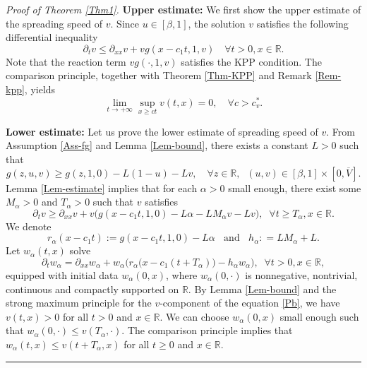 \documentclass[10pt]{article}
\numberwithin{equation}{section}
\newcommand{\R}{\mathbb{R}}
\newenvironment{proof}[1][Proof]{\noindent\textit{#1.} }{\hfill \rule{0.5em}{0.5em}}
\begin{document}
\begin{proof}[Proof of Theorem \ref{Thm1}]
\textbf{Upper estimate:}
 We  first  show the upper estimate of the spreading speed of $v$.  Since  $u\in [\beta, 1]$,  the solution $v$ satisfies the following differential inequality
\begin{equation*}
\partial_t  v \leq \partial_{xx} v + v g(x-c_1t, 1, v) \quad \forall t>0, x\in \R.
\end{equation*}
Note that  the reaction term   $vg(\cdot, 1, v)$ satisfies the  KPP condition.
The comparison principle, together with Theorem \ref{Thm-KPP} and Remark \ref{Rem-kpp},  yields 
 \begin{equation*}
\lim_{t\to +\infty} \sup_{ x\geq ct} v(t, x) =0,  \quad \forall c> c^*_v.
 \end{equation*}


\vspace{1em}
\noindent \textbf{Lower estimate: }
Let us  prove  the lower estimate of spreading speed of $v$.    From Assumption \ref{Ass-fg} and Lemma \ref{Lem-bound}, there exists a constant $L>0$ such that   
$$g(z,u,v)  \geq  g(z,1,0) - L(1-u) -Lv, \quad \forall z\in \R,  \;\; (u, v) \in [\beta, 1] \times [0, \overline{V}]. $$
 Lemma \ref{Lem-estimate} implies that  for each  $\alpha >0$ small  enough, there exist  some $M_{\alpha}>0$ and $T_{\alpha}>0$ such that $v$ satisfies 
\begin{equation*}
\partial_{t} v \geq \partial_{xx} v+ v \bigg( g(x-c_1t ,1,0) -L \alpha - LM_\alpha v -Lv\bigg),  \;\; \forall t\geq T_{\alpha},   x\in \R.
\end{equation*}
We denote  
$$r_{\alpha} (x- c_1 t):=  g(x-c_1 t, 1,0) - L \alpha   \;\; \text{ and }  \;\;    h_{\alpha}: = L M_{\alpha}   +L.$$
Let $w_\alpha (t,x)$  solve
\begin{equation} \label{subv}
\partial_{t} w_\alpha= \partial_{xx}w_\alpha+ w_\alpha \bigg( r_{\alpha} \big(x-c_1 (t+T_{\alpha}) \big) - h_\alpha w_\alpha \bigg),  \;\; \forall t>0,  x\in \R, 
\end{equation}
equipped with  initial data $w_\alpha (0, x)$, where   $w_\alpha (0, \cdot)$   is nonnegative, nontrivial,  continuous and compactly supported on  $\R$.   By Lemma \ref{Lem-bound} and the strong maximum principle for the $v$-component of the equation  \eqref{Pb},   we have $v(t,x)>0$ for all $t>0$  and $x\in \R$.   We can choose $w_\alpha (0, x)$ small enough such that $w_\alpha(0, \cdot) \leq v(T_\alpha, \cdot)$. The comparison principle implies that $w_{\alpha}(t,x)\leq v(t+T_{\alpha}, x)$ for all $t\geq 0$ and $x\in \R$.


\end{proof}
\end{document}
